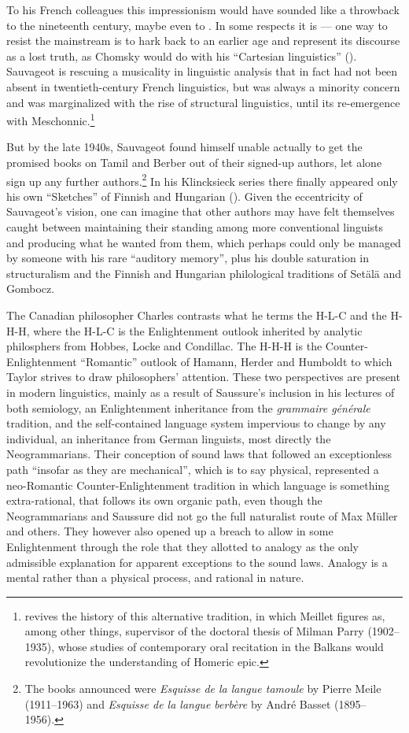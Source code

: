 \documentclass[output=paper]{langscibook}
\begin{document}
To his French colleagues this impressionism would have sounded like a throwback to the nineteenth century, maybe even to \citet{Rousseau1782175561}. In some respects it is — one way to resist the mainstream is to hark back to an earlier age and represent its discourse as a lost truth, as Chomsky would do with his ``Cartesian linguistics'' (\citeyear{Chomsky20091966}). Sauvageot is rescuing a musicality in linguistic analysis that in fact had not been absent in twentieth-century French linguistics, but was always a minority concern and was marginalized with the rise of structural linguistics, until its re-emergence with Meschonnic.\footnote{\citet{Saussy2016} revives the history of this alternative tradition, in which Meillet figures as, among other things, supervisor of the doctoral thesis of Milman Parry (1902--1935), whose studies of contemporary oral recitation in the Balkans would revolutionize the understanding of Homeric epic.}

But by the late 1940s, Sauvageot found himself unable actually to get the promised books on Tamil and Berber out of their signed-up authors, let alone sign up any further authors.\footnote{The books announced were \emph{Esquisse de la langue tamoule} by Pierre Meile (1911--1963) and \emph{Esquisse de la langue berbère} by André Basset (1895--1956).} In his Klincksieck series there finally appeared only his own ``Sketches'' of Finnish and Hungarian (\citeyear{Sauvageot1951}). Given the eccentricity of Sauvageot's vision, one can imagine that other authors may have felt themselves caught between maintaining their standing among more conventional linguists and producing what he wanted from them, which perhaps could only be managed by someone with his rare ``auditory memory'', plus his double saturation in structuralism and the Finnish and Hungarian philological traditions of Setälä and Gombocz.

The Canadian philosopher Charles \citet{Taylor2016} contrasts what he terms the H-L-C and the H-H-H, where the H-L-C is the Enlightenment outlook inherited by analytic philosphers from Hobbes, Locke and Condillac. The H-H-H is the Counter-Enlightenment ``Romantic'' outlook of Hamann, Herder and Humboldt to which Taylor strives to draw philosophers' attention. These two perspectives are present in modern linguistics, mainly as a result of Saussure's inclusion in his lectures of both semiology, an Enlightenment inheritance from the \emph{grammaire générale} tradition, and the self-contained language system impervious to change by any individual, an inheritance from German linguists, most directly the Neogrammarians. Their conception of sound laws that followed an exceptionless path ``insofar as they are mechanical'', which is to say physical, represented a neo-Romantic Counter-Enlightenment tradition in which language is something extra-rational, that follows its own organic path, even though the Neogrammarians and Saussure did not go the full naturalist route of Max Müller and others. They however also opened up a breach to allow in some Enlightenment through the role that they allotted to analogy as the only admissible explanation for apparent exceptions to the sound laws. Analogy is a mental rather than a physical process, and rational in nature.
\end{document}
